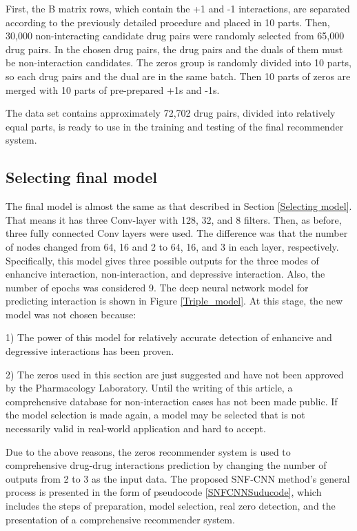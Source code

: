 \documentclass{bmcart}
\begin{document}
First, the B matrix rows, which contain the +1 and -1 interactions, are separated according to the previously detailed procedure and placed in 10 parts. Then, 30,000 non-interacting candidate drug pairs were randomly selected from 65,000 drug pairs. In the chosen drug pairs, the drug pairs and the duals of them must be non-interaction candidates. The zeros group is randomly divided into 10 parts, so each drug pairs and the dual are in the same batch. Then 10 parts of zeros are merged with 10 parts of pre-prepared +1s and -1s. 

The data set contains approximately 72,702 drug pairs, divided into relatively equal parts, is ready to use in the training and testing of the final recommender system.

\subsection*{Selecting final model}
The final model is almost the same as that described in Section
\ref{Selecting model}. That means it has three Conv-layer with 128, 32, and 8 filters. Then, as before, three fully connected Conv layers were used. The difference was that the number of nodes changed from 64, 16 and 2 to 64, 16, and 3 in each layer, respectively. Specifically, this model gives three possible outputs for the three modes of enhancive interaction, non-interaction, and depressive interaction. Also, the number of epochs was considered 9. The deep neural network model for predicting interaction is shown in Figure
\ref{Triple_model}. At this stage, the new model was not chosen because:

1) The power of this model for relatively accurate detection of enhancive and degressive interactions has been proven.

2) The zeros used in this section are just suggested and have not been approved by the Pharmacology Laboratory. Until the writing of this article, a comprehensive database for non-interaction cases has not been made public. If the model selection is made again, a model may be selected that is not necessarily valid in real-world application and hard to accept.

Due to the above reasons, the zeros recommender system is used to comprehensive drug-drug interactions prediction by changing the number of outputs from 2 to 3 as the input data. The proposed SNF-CNN method's general process is presented in the form of pseudocode \ref{SNFCNNSuducode}, which includes the steps of preparation, model selection, real zero detection, and the presentation of a comprehensive recommender system.
\end{document}
